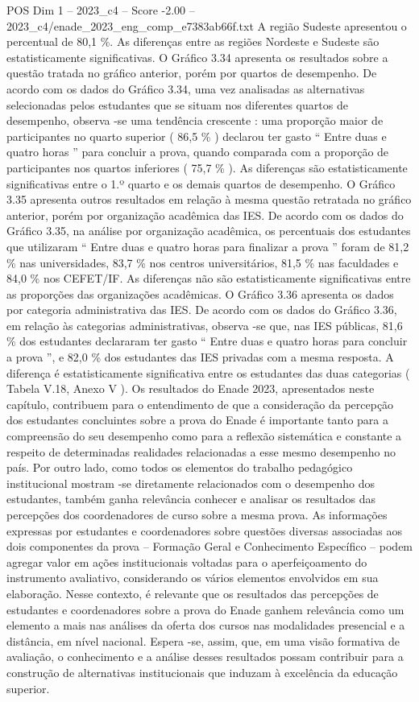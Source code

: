 \begin{textsample}{POS Dim 1 – 2023\_c4 – Score -2.00 – 2023\_c4/enade\_2023\_eng\_comp\_e7383ab66f.txt}
A região Sudeste apresentou o percentual de 80,1 \%.
As diferenças entre as regiões Nordeste e Sudeste são estatisticamente significativas.
O Gráfico 3.34 apresenta os resultados sobre a questão tratada no gráfico anterior, porém por quartos de desempenho.
De acordo com os dados do Gráfico 3.34, uma vez analisadas as alternativas selecionadas pelos estudantes que se situam nos diferentes quartos de desempenho, observa -se uma tendência crescente : uma proporção maior de participantes no quarto superior ( 86,5 \% ) declarou ter gasto “ Entre duas e quatro horas ” para concluir a prova, quando comparada com a proporção de participantes nos quartos inferiores ( 75,7 \% ).
As diferenças são estatisticamente significativas entre o 1.º quarto e os demais quartos de desempenho.
O Gráfico 3.35 apresenta outros resultados em relação à mesma questão retratada no gráfico anterior, porém por organização acadêmica das IES.
De acordo com os dados do Gráfico 3.35, na análise por organização acadêmica, os percentuais dos estudantes que utilizaram “ Entre duas e quatro horas para finalizar a prova ” foram de 81,2 \% nas universidades, 83,7 \% nos centros universitários, 81,5 \% nas faculdades e 84,0 \% nos CEFET/IF.
As diferenças não são estatisticamente significativas entre as proporções das organizações acadêmicas.
O Gráfico 3.36 apresenta os dados por categoria administrativa das IES.
De acordo com os dados do Gráfico 3.36, em relação às categorias administrativas, observa -se que, nas IES públicas, 81,6 \% dos estudantes declararam ter gasto “ Entre duas e quatro horas para concluir a prova ”, e 82,0 \% dos estudantes das IES privadas com a mesma resposta.
A diferença é estatisticamente significativa entre os estudantes das duas categorias ( Tabela V.18, Anexo V ).
Os resultados do Enade 2023, apresentados neste capítulo, contribuem para o entendimento de que a consideração da percepção dos estudantes concluintes sobre a prova do Enade é importante tanto para a compreensão do seu desempenho como para a reflexão sistemática e constante a respeito de determinadas realidades relacionadas a esse mesmo desempenho no país.
Por outro lado, como todos os elementos do trabalho pedagógico institucional mostram -se diretamente relacionados com o desempenho dos estudantes, também ganha relevância conhecer e analisar os resultados das percepções dos coordenadores de curso sobre a mesma prova.
As informações expressas por estudantes e coordenadores sobre questões diversas associadas aos dois componentes da prova – Formação Geral e Conhecimento Específico – podem agregar valor em ações institucionais voltadas para o aperfeiçoamento do instrumento avaliativo, considerando os vários elementos envolvidos em sua elaboração.
Nesse contexto, é relevante que os resultados das percepções de estudantes e coordenadores sobre a prova do Enade ganhem relevância como um elemento a mais nas análises da oferta dos cursos nas modalidades presencial e a distância, em nível nacional.
Espera -se, assim, que, em uma visão formativa de avaliação, o conhecimento e a análise desses resultados possam contribuir para a construção de alternativas institucionais que induzam à excelência da educação superior.

\end{textsample}
